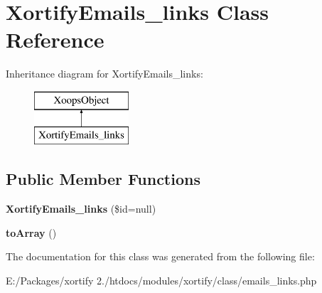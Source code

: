 \hypertarget{class_xortify_emails__links}{\section{Xortify\-Emails\-\_\-links Class Reference}
\label{class_xortify_emails__links}
}
Inheritance diagram for Xortify\-Emails\-\_\-links\-:\begin{figure}[H]
\begin{center}
\leavevmode
\includegraphics[height=2.000000cm]{class_xortify_emails__links}
\end{center}
\end{figure}
\subsection*{Public Member Functions}
\begin{DoxyCompactItemize}
\item 
\hypertarget{class_xortify_emails__links_af461a7ab5e840521f904fd3c091e41f9}{{\bfseries Xortify\-Emails\-\_\-links} (\$id=null)}\label{class_xortify_emails__links_af461a7ab5e840521f904fd3c091e41f9}

\item 
\hypertarget{class_xortify_emails__links_a6dfbb491fe72d4ed306c80ed56ac4c7c}{{\bfseries to\-Array} ()}\label{class_xortify_emails__links_a6dfbb491fe72d4ed306c80ed56ac4c7c}

\end{DoxyCompactItemize}


The documentation for this class was generated from the following file\-:\begin{DoxyCompactItemize}
\item 
E\-:/\-Packages/xortify 2./htdocs/modules/xortify/class/emails\-\_\-links.\-php\end{DoxyCompactItemize}
